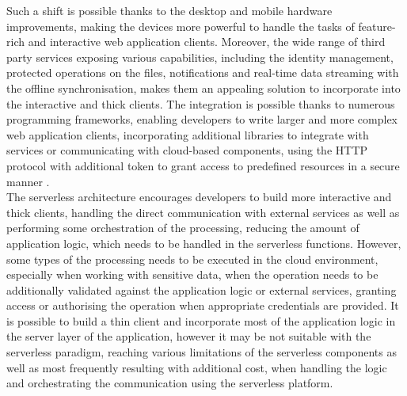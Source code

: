 Such a shift is possible thanks to the desktop and mobile hardware improvements, making the devices more powerful to handle the tasks of feature-rich and interactive web application clients.
Moreover, the wide range of third party services exposing various capabilities, including the identity management, protected operations on the files, notifications and real-time data streaming with the offline synchronisation, makes them an appealing solution to incorporate into the interactive and thick clients.
The integration is possible thanks to numerous programming frameworks, enabling developers to write larger and more complex web application clients, incorporating additional libraries to integrate with services or communicating with cloud-based components, using the HTTP protocol with additional token to grant access to predefined resources in a secure manner \cite{ServerlessTheFutureOfSoftwareArchitecture}. \\

The serverless architecture encourages developers to build more interactive and thick clients, handling the direct communication with external services as well as performing some orchestration of the processing, reducing the amount of application logic, which needs to be handled in the serverless functions.
However, some types of the processing needs to be executed in the cloud environment, especially when working with sensitive data, when the operation needs to be additionally validated against the application logic or external services, granting access or authorising the operation when appropriate credentials are provided.
It is possible to build a thin client and incorporate most of the application logic in the server layer of the application, however it may be not suitable with the serverless paradigm, reaching various limitations of the serverless components as well as most frequently resulting with additional cost, when handling the logic and orchestrating the communication using the serverless platform. \\

